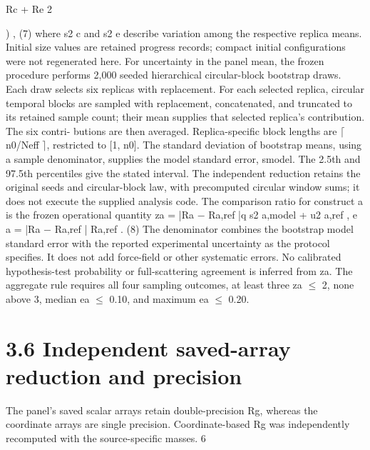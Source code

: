 \documentclass[11pt]{article}
\begin{document}


Rc + Re
2



)
, (7)
where s2
c and s2
e describe variation among the respective replica means. Initial size values are
retained progress records; compact initial configurations were not regenerated here.
For uncertainty in the panel mean, the frozen procedure performs 2,000 seeded hierarchical
circular-block bootstrap draws. Each draw selects six replicas with replacement. For each selected
replica, circular temporal blocks are sampled with replacement, concatenated, and truncated to
its retained sample count; their mean supplies that selected replica’s contribution. The six contri-
butions are then averaged. Replica-specific block lengths are \ensuremath{\lceil}n0/Neff \ensuremath{\rceil}, restricted to [1, n0]. The
standard deviation of bootstrap means, using a sample denominator, supplies the model standard
error, smodel. The 2.5th and 97.5th percentiles give the stated interval. The independent reduction
retains the original seeds and circular-block law, with precomputed circular window sums; it does
not execute the supplied analysis code.
The comparison ratio for construct a is the frozen operational quantity
za = |Ra \ensuremath{-} Ra,ref |q
s2
a,model + u2
a,ref
, e a = |Ra \ensuremath{-} Ra,ref |
Ra,ref
. (8)
The denominator combines the bootstrap model standard error with the reported experimental
uncertainty as the protocol specifies. It does not add force-field or other systematic errors. No
calibrated hypothesis-test probability or full-scattering agreement is inferred from za. The aggregate
rule requires all four sampling outcomes, at least three za \ensuremath{\leq} 2, none above 3, median ea \ensuremath{\leq} 0.10,
and maximum ea \ensuremath{\leq} 0.20.

\section*{3.6 Independent saved-array reduction and precision}

The panel’s saved scalar arrays retain double-precision Rg, whereas the coordinate arrays are single
precision. Coordinate-based Rg was independently recomputed with the source-specific masses.
6
\end{document}
